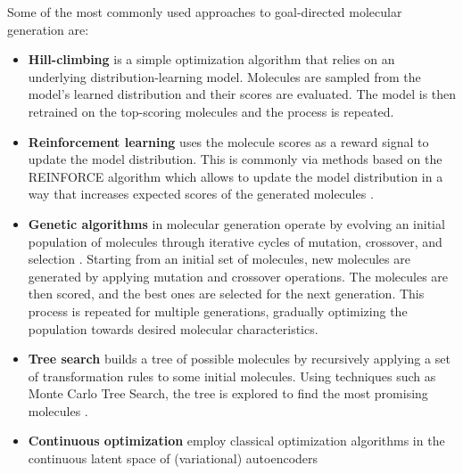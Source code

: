 Some of the most commonly used approaches to goal-directed molecular generation are:
\begin{itemize}
    \item \textbf{Hill-climbing}
          \citep{seglerGeneratingFocusedMolecule2018,xieMARSMarkovMolecular2021,thomasAugmentedHillClimbIncreases2022}
          is a simple optimization algorithm that relies on an underlying distribution-learning model.
          Molecules are sampled from the model's learned distribution and their scores are evaluated.
          The model is then retrained on the top-scoring molecules and the process is repeated.
    \item \textbf{Reinforcement learning} uses the molecule scores as a reward signal to update
          the model distribution. This is commonly via methods based on the REINFORCE algorithm
          \citep{williamsSimpleStatisticalGradientfollowing1992} which allows to update the model
          distribution in a way that increases expected scores of the generated molecules
          \citep{olivecronaMolecularDenovoDesign2017,thomasAugmentedHillClimbIncreases2022,youGraphConvolutionalPolicy2019,guoAugmentedMemoryCapitalizing2023}.
    \item \textbf{Genetic algorithms} in molecular generation operate by evolving an initial
          population of molecules through iterative cycles of mutation, crossover, and selection \citep{jensenGraphbasedGeneticAlgorithm2019,nigamGenerativeModelsSuperfast2021,yoshikawaPopulationbasedNovoMolecule2018}.
          Starting from an initial set of molecules, new molecules are generated by applying
          mutation and crossover operations. The molecules are then scored, and the best ones are
          selected for the next generation. This process is repeated for multiple generations,
          gradually optimizing the population towards desired molecular characteristics.
    \item \textbf{Tree search} builds a tree of possible molecules by recursively applying a set of transformation rules
          to some initial molecules. Using techniques such as Monte Carlo Tree Search, the tree is
          explored to find the most promising molecules \citep{yangChemTSEfficientPython2017,jensenGraphbasedGeneticAlgorithm2019}.
    \item \textbf{Continuous optimization} employ classical optimization algorithms in the continuous
          latent space of (variational) autoencoders
          \citep{gomez-bombarelliAutomaticChemicalDesign2018,kusnerGrammarVariationalAutoencoder2017,winterEfficientMultiobjectiveMolecular2019}

\end{itemize}
